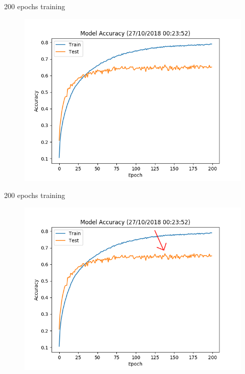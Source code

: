 \documentclass{beamer}
\begin{document}
\begin{frame}[fragile]{200 epochs training}
 \begin{figure}[H]
  \centering
  \includegraphics[scale=0.55]{img/accuracy.png}
 \end{figure}
\end{frame}
\begin{frame}[fragile]{200 epochs training}
 \begin{figure}[H]
  \centering
  \includegraphics[scale=0.4]{img/accuracy_arrow.png}
 \end{figure}
\end{frame}
\end{document}
